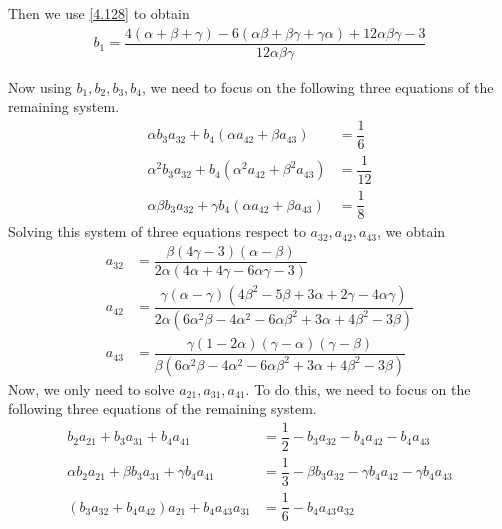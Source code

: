 \documentclass[a4paper,oneside]{book}
\numberwithin{equation}{chapter}
\begin{document}
Then we use \eqref{4.128} to obtain
\begin{align}
{b_1} = \dfrac{{4\left( {\alpha  + \beta  + \gamma } \right) - 6\left( {\alpha \beta  + \beta \gamma  + \gamma \alpha } \right) + 12\alpha \beta \gamma  - 3}}{{12\alpha \beta \gamma }}
\end{align}

Now using $b_1,b_2,b_3,b_4$, we need to focus on the following three equations of the remaining system.
\begin{align}
\alpha {b_3}{a_{32}} + {b_4}\left( {\alpha {a_{42}} + \beta {a_{43}}} \right) &= \dfrac{1}{6}\\
{\alpha ^2}{b_3}{a_{32}} + {b_4}\left( {{\alpha ^2}{a_{42}} + {\beta ^2}{a_{43}}} \right) &= \dfrac{1}{{12}}\\
\alpha \beta {b_3}{a_{32}} + \gamma {b_4}\left( {\alpha {a_{42}} + \beta {a_{43}}} \right) &= \dfrac{1}{8}
\end{align}
Solving this system of three equations respect to $a_{32},a_{42},a_{43}$, we obtain
\begin{align}
{a_{32}} &= \dfrac{{\beta \left( {4\gamma  - 3} \right)\left( {\alpha  - \beta } \right)}}{{2\alpha \left( {4\alpha  + 4\gamma  - 6\alpha \gamma  - 3} \right)}}\\
{a_{42}} &= \dfrac{{\gamma \left( {\alpha  - \gamma } \right)\left( {4{\beta ^2} - 5\beta  + 3\alpha  + 2\gamma  - 4\alpha \gamma } \right)}}{{2\alpha \left( {6{\alpha ^2}\beta  - 4{\alpha ^2} - 6\alpha {\beta ^2} + 3\alpha  + 4{\beta ^2} - 3\beta } \right)}}\\
{a_{43}} &= \dfrac{{\gamma \left( {1 - 2\alpha } \right)\left( {\gamma  - \alpha } \right)\left( {\gamma  - \beta } \right)}}{{\beta \left( {6{\alpha ^2}\beta  - 4{\alpha ^2} - 6\alpha {\beta ^2} + 3\alpha  + 4{\beta ^2} - 3\beta } \right)}}
\end{align}
Now, we only need to solve $a_{21},a_{31},a_{41}$. To do this, we need to focus on the following three equations of the remaining system.
\begin{align}
{b_2}{a_{21}} + {b_3}{a_{31}} + {b_4}{a_{41}} &= \dfrac{1}{2} - {b_3}{a_{32}} - {b_4}{a_{42}} - {b_4}{a_{43}}\\
\alpha {b_2}{a_{21}} + \beta {b_3}{a_{31}} + \gamma {b_4}{a_{41}}& = \dfrac{1}{3} - \beta {b_3}{a_{32}} - \gamma {b_4}{a_{42}} - \gamma {b_4}{a_{43}}\\
\left( {{b_3}{a_{32}} + {b_4}{a_{42}}} \right){a_{21}} + {b_4}{a_{43}}{a_{31}} &= \dfrac{1}{6} - {b_4}{a_{43}}{a_{32}}
\end{align}
\end{document}
